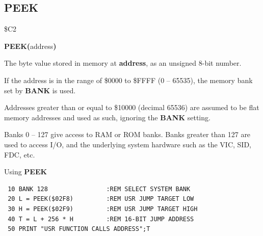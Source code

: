 
\newpage
\subsection{PEEK}
\begin{description}[leftmargin=2cm,style=nextline]
\item [Token:] \$C2
\item [Format:] {\bf PEEK(}address{\bf)}
\item [Returns:]  The byte value stored in memory at {\bf address}, as an
                unsigned 8-bit number.

                If the address is in the range of \$0000 to \$FFFF (0 -- 65535), the
                memory bank set by {\bf BANK} is used.

                Addresses greater than or equal to \$10000 (decimal 65536) are assumed to be flat memory
                addresses and used as such, ignoring the {\bf BANK} setting.

\item [Remarks:] Banks 0 -- 127 give access to RAM or ROM banks.
                 Banks greater than 127 are used to access I/O, and the underlying system hardware such as the
                 VIC, SID, FDC, etc.
\item [Example:] Using {\bf PEEK}

\begin{tcolorbox}[colback=black,coltext=white]
\verbatimfont{\codefont}
\begin{verbatim}
 10 BANK 128                :REM SELECT SYSTEM BANK
 20 L = PEEK($02F8)         :REM USR JUMP TARGET LOW
 30 H = PEEK($02F9)         :REM USR JUMP TARGET HIGH
 40 T = L + 256 * H         :REM 16-BIT JUMP ADDRESS
 50 PRINT "USR FUNCTION CALLS ADDRESS";T
\end{verbatim}
\end{tcolorbox}
\end{description}


\newpage

